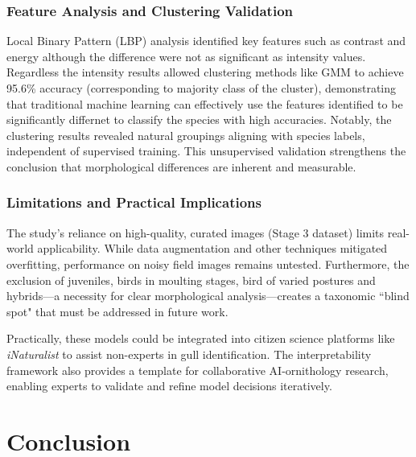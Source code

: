 \documentclass[a4paper,12pt]{report}
\begin{document}
\subsection{Feature Analysis and Clustering Validation}
Local Binary Pattern (LBP) analysis identified key features such as contrast and energy although the difference were not as significant as intensity values. Regardless the intensity results allowed clustering methods like GMM to achieve 95.6\% accuracy (corresponding to majority class of the cluster), demonstrating that traditional machine learning can effectively use the features identified to be significantly differnet to classify the species with high accuracies. Notably, the clustering results revealed natural groupings aligning with species labels, independent of supervised training. This unsupervised validation strengthens the conclusion that morphological differences are inherent and measurable.

\subsection{Limitations and Practical Implications}
The study’s reliance on high-quality, curated images (Stage 3 dataset) limits real-world applicability. While data augmentation and other techniques mitigated overfitting, performance on noisy field images remains untested. Furthermore, the exclusion of juveniles, birds in moulting stages, bird of varied postures and hybrids---a necessity for clear morphological analysis---creates a taxonomic ``blind spot" that must be addressed in future work.

Practically, these models could be integrated into citizen science platforms like \textit{iNaturalist} to assist non-experts in gull identification. The interpretability framework also provides a template for collaborative AI-ornithology research, enabling experts to validate and refine model decisions iteratively.

\chapter{Conclusion}
\end{document}
